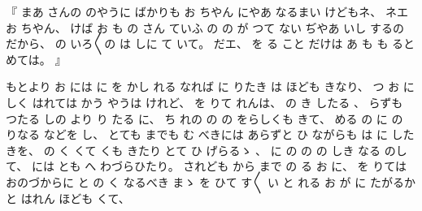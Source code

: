 
%
『
まあ
さんの
のやうに
ばかりも
お
ちやん
にやあ
なるまい
けどもネ、
%
ネエ
お
ちやん、
%
けば
お
も
の
さん
ていふ
の
の
が
つて
ない
ぢやあ
いし
するの
だから、
%
の
いろ〳〵の
は
しに
て
いて。
%
だエ、
%
を
る
こと
だけは
あ
も
も
ると
めては。
』

%
もとより
お
には
に
を
かし
れる
なれば
に
りたき
は
ほども
きなり、
%
つ
お
に
しく
はれては
%
かう
やうは
けれど、
%
を
りて
れんは、
%
の
き
したる
、
%
らずも
つたる
しの
より
り
たる
に、
%
ち
れの
の
の
をらしくも
きて、
%
める
の
に
の
りなる
などを
し、
%
とても
までも
む
べきには
あらずと
ひ
ながらも
は
に
したきを、
%
の
く
くて
くも
きたり
とて
ひ
げらるゝ
、
%
に
の
の
の
しき
なる
のして、
%
には
とも
へ
%
わづらひたり。
%
されども
から
まで
の
る
お
に、
%
を%
りては
おのづからに
と
の
く
なるべき
まゝ
を
ひて
す〳〵
い
と
れる
お
が
に
たがるかと
はれん
ほども
くて、


